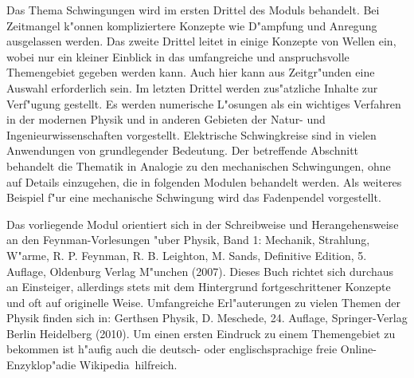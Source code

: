 \begin{MSectionStart}
Das Thema Schwingungen wird im ersten Drittel des Moduls behandelt. Bei Zeitmangel k"onnen kompliziertere Konzepte wie D"ampfung und Anregung ausgelassen werden. Das zweite Drittel leitet in einige Konzepte von Wellen ein, wobei nur ein kleiner Einblick in das umfangreiche und anspruchsvolle Themengebiet gegeben werden kann. Auch hier kann aus Zeitgr"unden eine Auswahl erforderlich sein. Im letzten Drittel werden zus"atzliche Inhalte zur Verf"ugung gestellt. Es werden numerische L"osungen als ein wichtiges Verfahren in der modernen Physik und in anderen Gebieten der Natur- und Ingenieurwissenschaften vorgestellt. Elektrische Schwingkreise sind in vielen Anwendungen von grundlegender Bedeutung. Der betreffende Abschnitt behandelt die Thematik in Analogie zu den mechanischen Schwingungen, ohne auf Details einzugehen, die in folgenden Modulen behandelt werden. Als weiteres Beispiel f"ur eine mechanische Schwingung wird das Fadenpendel vorgestellt.

Das vorliegende Modul orientiert sich in der Schreibweise und Herangehensweise an den Feynman-Vorlesungen "uber Physik, Band 1: Mechanik, Strahlung, W"arme, R. P. Feynman, R. B. Leighton, M. Sands, Definitive Edition, 5. Auflage, Oldenburg Verlag M"unchen (2007). Dieses Buch richtet sich durchaus an Einsteiger, allerdings stets mit dem Hintergrund fortgeschrittener Konzepte und oft auf originelle Weise.
Umfangreiche Erl"auterungen zu vielen Themen der Physik finden sich in: Gerthsen Physik, D. Meschede, 24. Auf\/lage, Springer-Verlag Berlin Heidelberg (2010).
Um einen ersten Eindruck zu einem Themengebiet zu bekommen ist h"aufig auch die deutsch- oder englischsprachige freie Online-Enzyklop"adie Wikipedia\textregistered\ hilfreich.


\end{MSectionStart}

